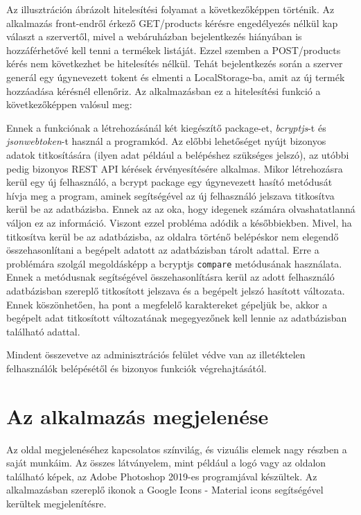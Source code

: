 Az illusztráción ábrázolt hitelesítési folyamat a következőképpen történik. Az alkalmazás front-endről érkező GET/products kérésre engedélyezés nélkül kap választ a szervertől, mivel a webáruházban bejelentkezés hiányában is hozzáférhetővé kell tenni a termékek listáját. Ezzel szemben a POST/products kérés nem következhet be hitelesítés nélkül. Tehát bejelentkezés során a szerver generál egy úgynevezett tokent és elmenti a LocalStorage-ba, amit az új termék hozzáadása kérésnél ellenőriz. Az alkalmazásban ez a hitelesítési funkció a következőképpen valósul meg:

Ennek a funkciónak a létrehozásánál két kiegészítő package-et, \textit{bcryptjs}-t és \textit{jsonwebtoken}-t használ a programkód. Az előbbi lehetőséget nyújt bizonyos adatok titkosítására (ilyen adat például a belépéshez szükséges jelszó), az utóbbi pedig bizonyos REST API kérések érvényesítésére alkalmas. Mikor létrehozásra kerül egy új felhasználó, a bcrypt package egy úgynevezett hasító metódusát hívja meg a program, aminek segítségével az új felhasználó jelszava titkosítva kerül be az adatbázisba. Ennek az az oka, hogy idegenek számára olvashatatlanná váljon ez az információ. Viszont ezzel probléma adódik a későbbiekben. Mivel, ha titkosítva kerül be az adatbázisba, az oldalra történő belépéskor nem elegendő összehasonlítani a begépelt adatott az adatbázisban tárolt adattal. Erre a problémára szolgál megoldásképp a bcryptjs \verb|compare| metódusának használata. Ennek a metódusnak segítségével összehasonlításra kerül az adott felhasználó adatbázisban szereplő titkosított jelszava és a begépelt jelszó hasított változata. Ennek köszönhetően, ha pont a megfelelő karaktereket gépeljük be, akkor a begépelt adat titkosított változatának megegyezőnek kell lennie az adatbázisban található adattal.

Mindent összevetve az adminisztrációs felület védve van az illetéktelen felhasználók belépésétől és bizonyos funkciók végrehajtásától.

\section{Az alkalmazás megjelenése}
Az oldal megjelenéséhez kapcsolatos színvilág, és vizuális elemek nagy részben a saját munkáim. Az összes látványelem, mint például a logó vagy az oldalon található képek, az Adobe Photoshop\cite{photoshop} 2019-es programjával készültek. Az alkalmazásban szereplő ikonok a Google Icons - Material icons\cite{material} segítségével kerültek megjelenítésre.

